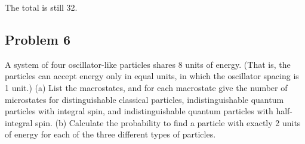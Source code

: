 \documentclass[12pt]{article}
\begin{document}
            The total is still 32.
            
        
    \pagebreak
    \subsection{Problem 6}
        A system of four oscillator-like particles shares 8 units of energy. 
        (That is, the particles can accept energy only in equal units, in which the oscillator spacing is 1 unit.)
        (a) List the macrostates, and for each macrostate give the number of microstates for distinguishable classical particles, indistinguishable quantum particles with integral spin, and indistinguishable quantum particles with half-integral spin.
        (b) Calculate the probability to ﬁnd a particle with exactly 2 units of energy for each of the three different types of particles.
\end{document}

